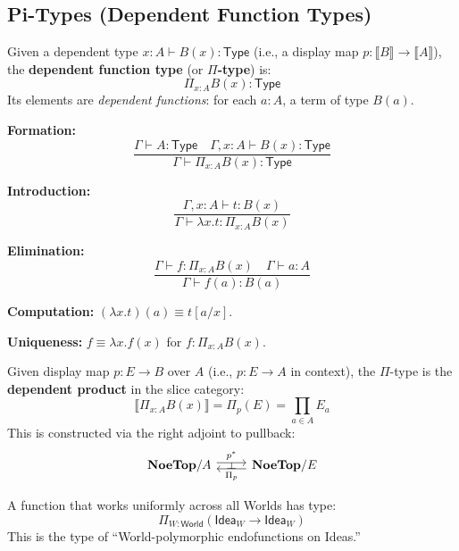\subsection{Pi-Types (Dependent Function Types)}
\label{subsec:pi-types}

\begin{definition}[$\Pi$-Type]
\label{def:pi-type}
Given a dependent type $x : A \vdash B(x) : \mathsf{Type}$ (i.e., a display map
$p : \llbracket B \rrbracket \to \llbracket A \rrbracket$), the \textbf{dependent
function type} (or \textbf{$\Pi$-type}) is:
\[
  \Pi_{x : A} B(x) : \mathsf{Type}
\]
Its elements are \emph{dependent functions}: for each $a : A$, a term of type $B(a)$.
\end{definition}

\begin{definition}
\label{def:pi-type-rules}
\textbf{Formation:}
\[
  \frac{\Gamma \vdash A : \mathsf{Type} \quad \Gamma, x : A \vdash B(x) : \mathsf{Type}}
       {\Gamma \vdash \Pi_{x : A} B(x) : \mathsf{Type}}
\]

\textbf{Introduction:}
\[
  \frac{\Gamma, x : A \vdash t : B(x)}
       {\Gamma \vdash \lambda x. t : \Pi_{x : A} B(x)}
\]

\textbf{Elimination:}
\[
  \frac{\Gamma \vdash f : \Pi_{x : A} B(x) \quad \Gamma \vdash a : A}
       {\Gamma \vdash f(a) : B(a)}
\]

\textbf{Computation:} $(\lambda x. t)(a) \equiv t[a/x]$.

\textbf{Uniqueness:} $f \equiv \lambda x. f(x)$ for $f : \Pi_{x:A} B(x)$.
\end{definition}

\begin{definition}
\label{def:pi-categorical}
Given display map $p : E \to B$ over $A$ (i.e., $p : E \to A$ in context), the
$\Pi$-type is the \textbf{dependent product} in the slice category:
\[
  \llbracket \Pi_{x:A} B(x) \rrbracket = \Pi_p(E) = \prod_{a \in A} E_a
\]
This is constructed via the right adjoint to pullback:
\[
\begin{tikzcd}
  \mathbf{NoeTop}/A \arrow[r, shift left, "p^*"{name=U}]
  & \mathbf{NoeTop}/E \arrow[l, shift left, "\Pi_p"{name=D}]
  \arrow[phantom, from=U, to=D, "\dashv" rotate=-90]
\end{tikzcd}
\]
\end{definition}

\begin{example}
\label{ex:world-polymorphic}
A function that works uniformly across all Worlds has type:
\[
  \Pi_{W : \mathsf{World}} (\mathsf{Idea}_W \to \mathsf{Idea}_W)
\]
This is the type of ``World-polymorphic endofunctions on Ideas.''
\end{example}

